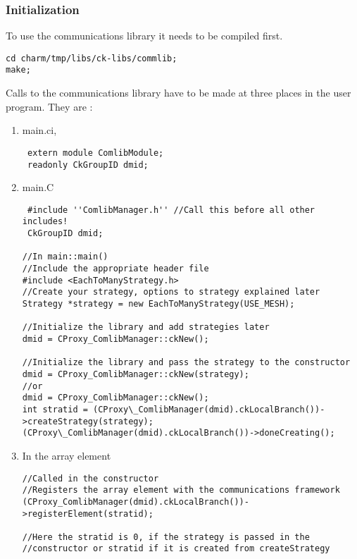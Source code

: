 \subsubsection{Initialization}

To use the communications library it needs to be compiled first.

\begin{verbatim}
cd charm/tmp/libs/ck-libs/commlib;
make;
\end{verbatim}

Calls to the communications library have to be made at three places in
the user program. They are :

\begin{enumerate}

\item main.ci, \\
\begin{verbatim}
 extern module ComlibModule; 
 readonly CkGroupID dmid; 
\end{verbatim}

\item main.C \\
\begin{verbatim}
 #include ''ComlibManager.h'' //Call this before all other includes!
 CkGroupID dmid; 

//In main::main() 
//Include the appropriate header file
#include <EachToManyStrategy.h>
//Create your strategy, options to strategy explained later
Strategy *strategy = new EachToManyStrategy(USE_MESH);

//Initialize the library and add strategies later
dmid = CProxy_ComlibManager::ckNew(); 

//Initialize the library and pass the strategy to the constructor
dmid = CProxy_ComlibManager::ckNew(strategy); 
//or 
dmid = CProxy_ComlibManager::ckNew(); 
int stratid = (CProxy\_ComlibManager(dmid).ckLocalBranch())->createStrategy(strategy);
(CProxy\_ComlibManager(dmid).ckLocalBranch())->doneCreating();
\end{verbatim}

\item In the array element \\
\begin{verbatim}
//Called in the constructor
//Registers the array element with the communications framework
(CProxy_ComlibManager(dmid).ckLocalBranch())->registerElement(stratid);

//Here the stratid is 0, if the strategy is passed in the 
//constructor or stratid if it is created from createStrategy


\end{verbatim}
\end{enumerate}
